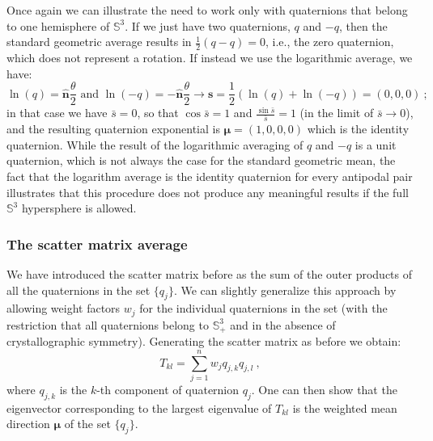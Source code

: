 Once again we can illustrate the need to work only with quaternions that belong to one hemisphere of $\mathbb{S}^3$.  If we just have two quaternions, $q$ and $-q$, then the standard geometric average results in $\frac{1}{2}(q-q)=0$, i.e., the zero quaternion, which does not represent a rotation. If instead we use the logarithmic average, we have:
\[
	\ln(q) = \hat{\mathbf{n}}\frac{\theta}{2}\text{ and } \ln(-q) = -\hat{\mathbf{n}}\frac{\theta}{2}\rightarrow \mathbf{s} = \frac{1}{2}(\ln(q)+\ln(-q)) = (0,0,0)\ ;
\]
in that case we have $\bar{s} = 0$, so that $\cos\bar{s}=1$ and $\frac{\sin\bar{s}}{\bar{s}}=1$ (in the limit of $\bar{s}\rightarrow 0$), and the resulting quaternion exponential is $\bm{\mu}=(1,0,0,0)$ which is the identity quaternion.  While the result of the logarithmic averaging of $q$ and $-q$ is a unit quaternion, which is not always the case for the standard geometric mean, the fact that the logarithm average is the identity quaternion for every antipodal pair illustrates that this procedure does not produce any meaningful results if the full $\mathbb{S}^3$ hypersphere is allowed. 

\subsubsection{The scatter matrix average}\label{\chabbr:ssec:scatav}
We have introduced the scatter matrix before as the sum of the outer products of all the quaternions in the set $\{q_j\}$. We can slightly generalize this approach by allowing weight factors $w_j$ for the individual quaternions in the set (with the restriction that all quaternions belong to $\mathbb{S}^3_+$ and in the absence of crystallographic symmetry).  Generating the scatter matrix as before we obtain:
\begin{equation}
	T_{kl} = \sum_{j=1}^n w_j q_{j,k}q_{j,l}\ ,
\end{equation}
where $q_{j,k}$ is the $k$-th component of quaternion $q_j$.  One can then show that the eigenvector corresponding to the largest eigenvalue of $T_{kl}$ is the weighted mean direction $\bm{\mu}$ of the set $\{q_j\}$.  

